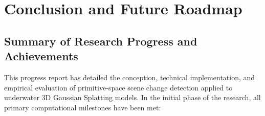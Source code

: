 
\chapter{Conclusion and Future Roadmap}
\label{chap:conclusion}

\section{Summary of Research Progress and Achievements}
\label{sec:conclusion_summary}
This progress report has detailed the conception, technical implementation, and empirical evaluation of primitive-space scene change detection applied to underwater 3D Gaussian Splatting models. In the initial phase of the research, all primary computational milestones have been met:
